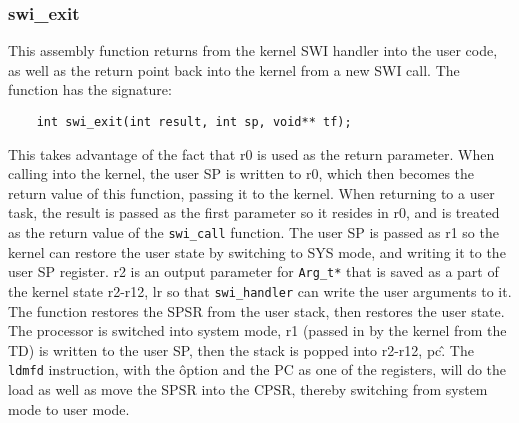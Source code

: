 \documentclass[12pt]{article}
\begin{document}
\subsubsection{swi\_exit}
This assembly function returns from the kernel SWI handler into the user code, as well as the return point back into the kernel from a new SWI call. The function has the signature:
\begin{center}
  \begin{verbatim}
    int swi_exit(int result, int sp, void** tf);
  \end{verbatim}
\end{center}
This takes advantage of the fact that r0 is used as the return parameter. When calling into the kernel, the user SP is written to r0, which then becomes the return value of this function, passing it to the kernel. When returning to a user task, the result is passed as the first parameter so it resides in r0, and is treated as the return value of the \texttt{swi\_call} function.
The user SP is passed as r1 so the kernel can restore the user state by switching to SYS mode, and writing it to the user SP register.
r2 is an output parameter for \texttt{Arg\_t*} that is saved as a part of the kernel state {r2-r12, lr} so that \texttt{swi\_handler} can write the user arguments to it.
The function restores the SPSR from the user stack, then restores the user state. The processor is switched into system mode, r1 (passed in by the kernel from the TD) is written to the user SP, then the stack is popped into {r2-r12, pc}\^. The \texttt{ldmfd} instruction, with the \^ option and the PC as one of the registers, will do the load as well as move the SPSR into the CPSR, thereby switching from system mode to user mode.
\\[2\baselineskip]
\end{document}
